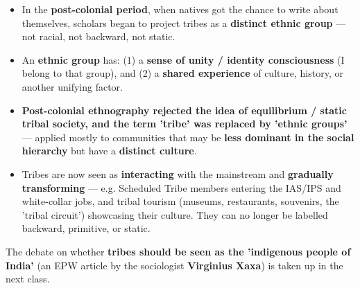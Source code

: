 \begin{KeyConcept}
\begin{itemize}
\item In the \textbf{post-colonial period}, when natives got the chance to write about themselves, scholars began to project tribes as a \textbf{distinct ethnic group} --- not racial, not backward, not static.
\item An \textbf{ethnic group} has: (1) a \textbf{sense of unity / identity consciousness} (I belong to that group), and (2) a \textbf{shared experience} of culture, history, or another unifying factor.
\item \textbf{Post-colonial ethnography rejected the idea of equilibrium / static tribal society, and the term 'tribe' was replaced by 'ethnic groups'} --- applied mostly to communities that may be \textbf{less dominant in the social hierarchy} but have a \textbf{distinct culture}.
\item Tribes are now seen as \textbf{interacting} with the mainstream and \textbf{gradually transforming} --- e.g. Scheduled Tribe members entering the IAS/IPS and white-collar jobs, and tribal tourism (museums, restaurants, souvenirs, the 'tribal circuit') showcasing their culture. They can no longer be labelled backward, primitive, or static.
\end{itemize}
\end{KeyConcept}

The debate on whether \textbf{tribes should be seen as the 'indigenous people of India'} (an EPW article by the sociologist \textbf{Virginius Xaxa}) is taken up in the next class.

